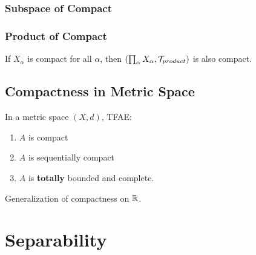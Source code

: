 \subsubsection{Subspace of Compact}

\subsubsection{Product of Compact}

\begin{theorem}[Tychonoff]
    If $X_\alpha$ is compact for all $\alpha$, then $(\prod_{\alpha}X_{\alpha},\mathcal{T}_{product})$ is also compact.
\end{theorem}

\subsection{Compactness in Metric Space}

\begin{theorem}
    In a metric space $(X,d)$, TFAE:
    \begin{enumerate}[label=(\roman*)]
        \item $A$ is compact
        \item $A$ is sequentially compact
        \item $A$ is \textbf{totally} bounded and complete.
    \end{enumerate}
\end{theorem}
\begin{remark}
    Generalization of compactness on $\mathbb{R}$.
\end{remark}


\section{Separability}

\begin{definition}
    
\end{definition}

\begin{definition}
    
\end{definition}

